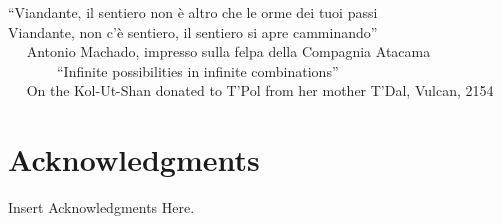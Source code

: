 
\begin{flushright}
``Viandante, il sentiero non \`e altro che le orme dei tuoi passi \\
 Viandante, non c'\`e sentiero, il sentiero si apre camminando''\\ \,\,\,\,\,\,
\scriptsize
Antonio Machado, impresso sulla felpa della Compagnia Atacama \\ \,\,\,\,\,\,\,\,\,\,\,\,\,\,\,\,\,\,\,
\normalsize
``Infinite possibilities in infinite combinations'' \\ \,\,\,\,\,\,
\scriptsize
On the Kol-Ut-Shan donated to T'Pol from her mother T'Dal, Vulcan, 2154
\end{flushright}

\section*{Acknowledgments}
\lhead[\fancyplain{}{\thepage}]{\fancyplain{}{\rightmark}}
 \thispagestyle{plain}


	Insert Acknowledgments Here.


\clearpage


\thispagestyle{plain}
\par{}
\clearpage


